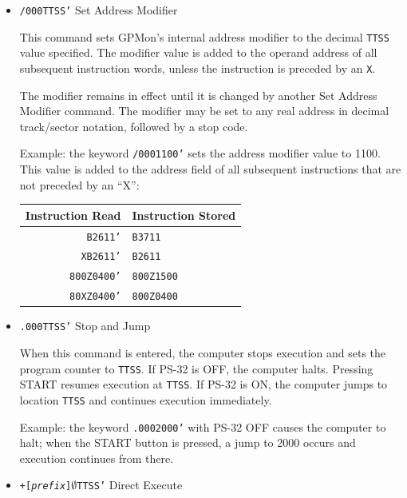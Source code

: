 \begin{itemize}
\noindent Non-relocatable instructions will be stored exactly as given and their address field will not be adjusted by the address modifier.

\item \texttt{/000TTSS'} Set Address Modifier

This command sets GPMon's internal address modifier to the decimal \texttt{TTSS} value specified. The modifier value is added to the operand address of all subsequent instruction words, unless the instruction is preceded by an \texttt{X}.

The modifier remains in effect until it is changed by another Set Address Modifier command. The modifier may be set to any real address in decimal track/sector notation, followed by a stop code.

Example: the keyword \texttt{/0001100'} sets the address modifier value to 1100. This value is added to the address field of all subsequent instructions that are not preceded by an ``X'':

\begin{center}
\begin{tabular}{rl}
    \toprule
    \textbf{Instruction Read} & \textbf{Instruction Stored} \\
    \midrule
    \texttt{B2611'}           & \texttt{B3711} \\
    \texttt{XB2611'}          & \texttt{B2611} \\
    \texttt{800Z0400'}        & \texttt{800Z1500} \\
    \texttt{80XZ0400'}        & \texttt{800Z0400} \\
    \bottomrule
\end{tabular}
\end{center}

\item \texttt{.000TTSS'} Stop and Jump

When this command is entered, the computer stops execution and sets the program counter to \texttt{TTSS}. If \textsf{PS-32} is \textsf{OFF}, the computer halts. Pressing \textsf{START} resumes execution at \texttt{TTSS}. If \textsf{PS-32} is \textsf{ON}, the computer jumps to location \texttt{TTSS} and continues execution immediately.

Example: the keyword \texttt{.0002000'} with \textsf{PS-32 OFF} causes the computer to halt; when the \textsf{START} button is pressed, a jump to 2000 occurs and execution continues from there.

\item \texttt{+[\textit{prefix}]$\emptyset$TTSS'} Direct Execute


\end{itemize}
